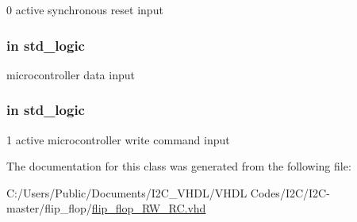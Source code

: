 \textquotesingle{}0\textquotesingle{} active synchronous reset input 

\subsubsection[{\texorpdfstring{uc\+\_\+data\+\_\+in}{uc_data_in}}]{ {\bfseries \textcolor{vhdlchar}{in}\textcolor{vhdlchar}{ }} {\bfseries \textcolor{vhdlchar}{std\+\_\+logic}\textcolor{vhdlchar}{ }} \hspace{0.3cm}{\ttfamily [Port]}}\hypertarget{classflip__flop___r_w___r_c_aeb86d5268b7f0b59c74427f44096ffd5}{}\label{classflip__flop___r_w___r_c_aeb86d5268b7f0b59c74427f44096ffd5}


microcontroller data input 

\subsubsection[{\texorpdfstring{uc\+\_\+write\+\_\+command}{uc_write_command}}]{ {\bfseries \textcolor{vhdlchar}{in}\textcolor{vhdlchar}{ }} {\bfseries \textcolor{vhdlchar}{std\+\_\+logic}\textcolor{vhdlchar}{ }} \hspace{0.3cm}{\ttfamily [Port]}}\hypertarget{classflip__flop___r_w___r_c_adec7180b72b510c9b6576424bd7fde7e}{}\label{classflip__flop___r_w___r_c_adec7180b72b510c9b6576424bd7fde7e}


\textquotesingle{}1\textquotesingle{} active microcontroller write command input 



The documentation for this class was generated from the following file\+:\begin{DoxyCompactItemize}
\item 
C\+:/\+Users/\+Public/\+Documents/\+I2\+C\+\_\+\+V\+H\+D\+L/\+V\+H\+D\+L Codes/\+I2\+C/\+I2\+C-\/master/flip\+\_\+flop/\hyperlink{flip__flop___r_w___r_c_8vhd}{flip\+\_\+flop\+\_\+\+R\+W\+\_\+\+R\+C.\+vhd}\end{DoxyCompactItemize}
